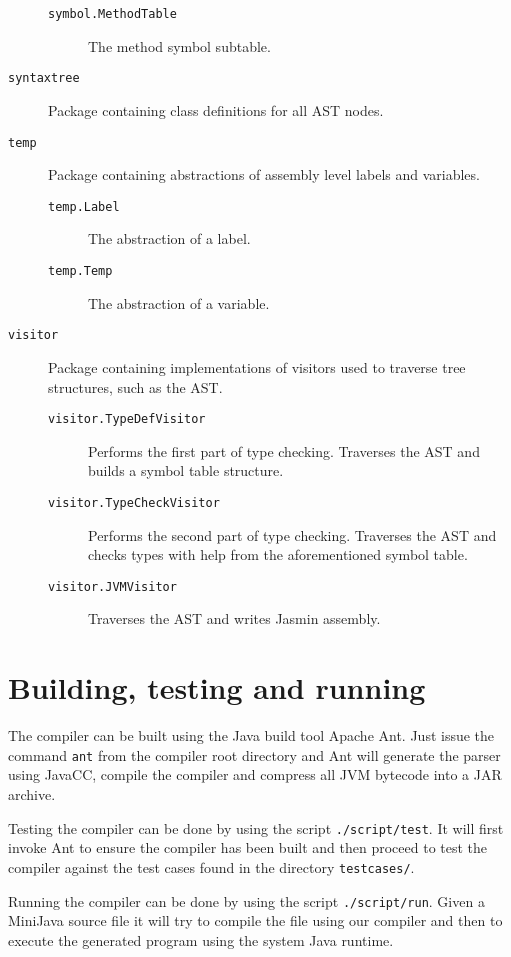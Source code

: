 \documentclass[a4paper]{article}
\begin{document}
\begin{description}
\begin{description}
        \item[\texttt{symbol.MethodTable}] The method symbol subtable.
    \end{description}
\item[\texttt{syntaxtree}] Package containing class definitions for all AST
    nodes.
\item[\texttt{temp}] Package containing abstractions of assembly level labels
    and variables.
    \begin{description}
        \item[\texttt{temp.Label}] The abstraction of a label.
        \item[\texttt{temp.Temp}] The abstraction of a variable.
    \end{description}
\item[\texttt{visitor}] Package containing implementations of visitors used to
    traverse tree structures, such as the AST.
    \begin{description}
        \item[\texttt{visitor.TypeDefVisitor}] Performs the first part of type
            checking. Traverses the AST and builds a symbol table structure.
        \item[\texttt{visitor.TypeCheckVisitor}] Performs the second part of
            type checking. Traverses the AST and checks types with help from the
            aforementioned symbol table.
        \item[\texttt{visitor.JVMVisitor}] Traverses the AST and writes Jasmin
            assembly.
    \end{description}
\end{description}

\section{Building, testing and running}

The compiler can be built using the Java build tool Apache Ant\texttrademark.
Just issue the command \texttt{ant} from the compiler root directory and Ant
will generate the parser using JavaCC, compile the compiler and compress all JVM
bytecode into a JAR archive.

Testing the compiler can be done by using the script \texttt{./script/test}. It
will first invoke Ant to ensure the compiler has been built and then proceed to
test the compiler against the test cases found in the directory
\texttt{testcases/}.

Running the compiler can be done by using the script \texttt{./script/run}.
Given a MiniJava source file it will try to compile the file using our compiler
and then to execute the generated program using the system Java runtime.
\end{document}

